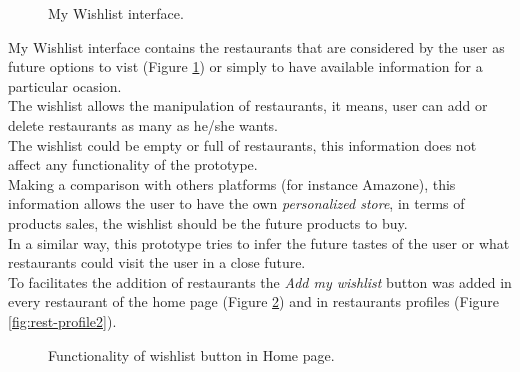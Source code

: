 \begin{figure}
\captionsetup{font=footnotesize}
\centering
{}
\caption{My Wishlist interface.}
\label{fig:mywishlist}   
\end{figure}
My Wishlist interface contains the restaurants that are  considered by
the user as future options to vist  (Figure  \ref{fig:mywishlist})  or
simply to have available information for a particular  ocasion. \\The
wishlist allows the manipulation of restaurants,  it means, user can
add or delete restaurants as many as  he/she wants. \\The wishlist could
be empty or full of  restaurants, this information does not affect any
functionality  of the prototype. \\
Making a comparison with others platforms (for instance 
Amazone), this information allows the user to have the own 
\textit{personalized store}, in terms of products sales, the wishlist 
should be the future products to buy.\\ In a similar way, 
this prototype tries to infer the future tastes of the user 
or what restaurants could visit the user in a close future. \\
To facilitates the addition of restaurants the \textit{Add my wishlist} 
button was added in every restaurant of the home 
page (Figure  \ref{fig:wishlist-home}) and in restaurants 
profiles (Figure  \ref{fig:rest-profile2}).
\begin{figure}
\captionsetup{font=footnotesize}
\centering
{}
\caption{Functionality of wishlist button in Home page.}
\label{fig:wishlist-home}   
\end{figure}

